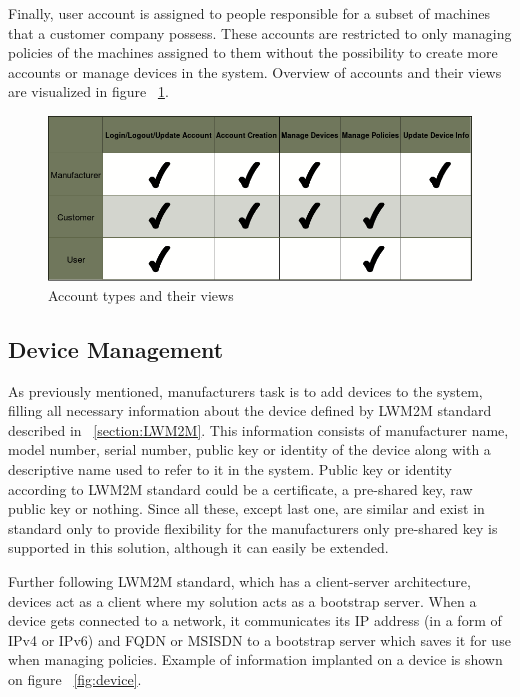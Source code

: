 Finally, user account is assigned to people responsible for a subset of machines that a customer company possess. These accounts are restricted to only managing policies of the machines assigned to them without the possibility to create more accounts or manage devices in the system. Overview of accounts and their views are visualized in figure ~\ref{fig:accountTypes}.

\begin{figure}[ht]
	\begin{center}
		\includegraphics[width=\textwidth]{images/Functionalities}
		\caption{Account types and their views}
		\label{fig:accountTypes}
	\end{center}
\end{figure}

\subsection{Device Management}
\label{deviceManagement}

As previously mentioned, manufacturers task is to add devices to the system, filling all necessary information about the device defined by LWM2M standard described in ~\ref{section:LWM2M}. This information consists of manufacturer name, model number, serial number, public key or identity of the device along with a descriptive name used to refer to it in the system. Public key or identity according to LWM2M standard could be a certificate, a pre-shared key, raw public key or nothing. Since all these, except last one, are similar and exist in standard only to provide flexibility for the manufacturers only pre-shared key is supported in this solution, although it can easily be extended. 

Further following LWM2M standard, which has a client-server architecture, devices act as a client where my solution acts as a bootstrap server. When a device gets connected to a network, it communicates its IP address (in a form of IPv4 or IPv6) and FQDN or MSISDN to a bootstrap server which saves it for use when managing policies. Example of information implanted on a device is shown on figure ~\ref{fig:device}.

